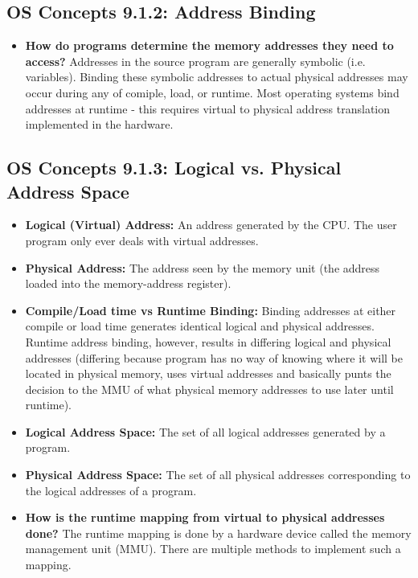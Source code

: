 \documentclass[12pt]{article}
\begin{document}
\subsection*{OS Concepts 9.1.2: Address Binding}

\begin{itemize}
    \item \textbf{How do programs determine the memory addresses they need to access?} Addresses in the source program are generally symbolic (i.e. variables). Binding these symbolic addresses to actual physical addresses may occur during any of comiple, load, or runtime. Most operating systems bind addresses at runtime - this requires virtual to physical address translation implemented in the hardware.
\end{itemize}

\subsection*{OS Concepts 9.1.3: Logical vs. Physical Address Space}

\begin{itemize}
    \item \textbf{Logical (Virtual) Address:} An address generated by the CPU. The user program only ever deals with virtual addresses.
    \item \textbf{Physical Address:} The address seen by the memory unit (the address loaded into the memory-address register).
    \item \textbf{Compile/Load time vs Runtime Binding:} Binding addresses at either compile or load time generates identical logical and physical addresses. Runtime address binding, however, results in differing logical and physical addresses (differing because program has no way of knowing where it will be located in physical memory, uses virtual addresses and basically punts the decision to the MMU of what physical memory addresses to use later until runtime).
    \item \textbf{Logical Address Space:} The set of all logical addresses generated by a program.
    \item \textbf{Physical Address Space:} The set of all physical addresses corresponding to the logical addresses of a program.
    \item \textbf{How is the runtime mapping from virtual to physical addresses done?} The runtime mapping is done by a hardware device called the memory management unit (MMU). There are multiple methods to implement such a mapping.
\end{itemize}
\end{document}
